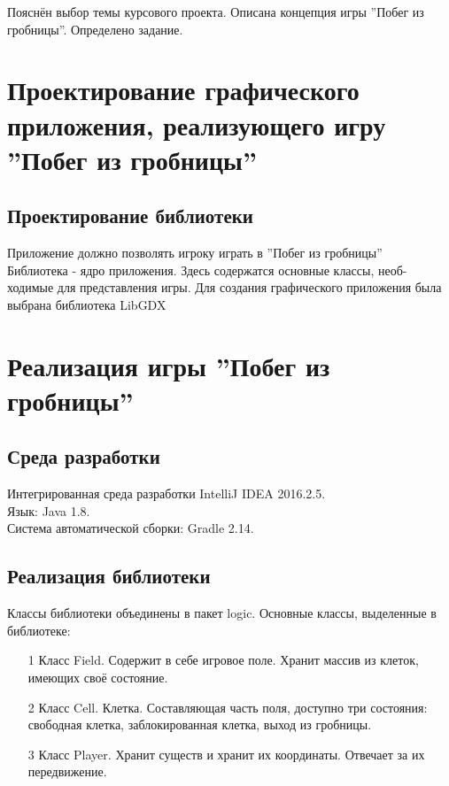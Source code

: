 \documentclass[a4paper]{article}
\begin{document}
Пояснён выбор темы курсового проекта. Описана концепция игры ''Побег из гробницы''. Определено задание.


\section{Проектирование графического приложения, реализующего игру ''Побег из гробницы''}

\subsection{Проектирование библиотеки}

Приложение должно позволять игроку играть в ''Побег из гробницы''\\

Библиотека - ядро приложения. Здесь содержатся основные классы, необ-
ходимые для представления игры. Для создания графического приложения
была выбрана библиотека LibGDX

\section{Реализация игры ''Побег из гробницы''}

\subsection{Среда разработки}

Интегрированная среда разработки IntelliJ IDEA 2016.2.5.\\
Язык: Java 1.8.\\
Система автоматической сборки: Gradle 2.14.

\subsection{Реализация библиотеки}

Классы библиотеки объединены в пакет logic. Основные классы,
выделенные в библиотеке:\\

\begin{enumerate}
\item[1]  Класс Field. Содержит в себе игровое поле. Хранит массив из клеток, имеющих своё состояние.
\item[2]  Класс Cell. Клетка. Составляющая часть поля, доступно три состояния: свободная клетка, заблокированная клетка, выход из гробницы.
\item[3]  Класс Player. Хранит существ и хранит их координаты. Отвечает за их передвижение. 
\end{enumerate}
\end{document}
